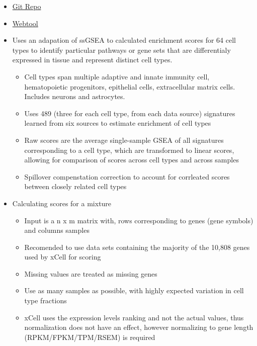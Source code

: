 \documentclass[]{book}
\providecommand{\tightlist}{%
  \setlength{\itemsep}{0pt}\setlength{\parskip}{0pt}}
\begin{document}
\begin{itemize}
\tightlist
\item
  \href{https://github.com/dviraran/xCell}{Git Repo}
\item
  \href{https://xcell.ucsf.edu/}{Webtool}
\item
  Uses an adapation of ssGSEA to calculated enrichment scores for 64 cell types to identify particular pathways or gene sets that are differentialy expressed in tissue and represent distinct cell types.

  \begin{itemize}
  \tightlist
  \item
    Cell types span multiple adaptive and innate immunity cell, hematopoietic progenitors, epithelial cells, extracellular matrix cells. Includes neurons and astrocytes.
  \item
    Uses 489 (three for each cell type, from each data source) signatures learned from six sources to estimate enrichment of cell types
  \item
    Raw scores are the average single-sample GSEA of all signatures corresponding to a cell type, which are transformed to linear scores, allowing for comparison of scores across cell types and across samples
  \item
    Spillover compenstation correction to account for corrleated scores between closely related cell types
  \end{itemize}
\item
  Calculating scores for a mixture

  \begin{itemize}
  \tightlist
  \item
    Input is a n x m matrix with, rows corresponding to genes (gene symbols) and columns samples
  \item
    Recomended to use data sets containing the majority of the 10,808 genes used by xCell for scoring
  \item
    Missing values are treated as missing genes
  \item
    Use as many samples as possible, with highly expected variation in cell type fractions
  \item
    xCell uses the expression levels ranking and not the actual values, thus normalization does not have an effect, however normalizing to gene length (RPKM/FPKM/TPM/RSEM) is required


\end{itemize}
\end{itemize}
\end{document}
